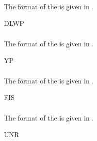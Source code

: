 \subsubsection{}\label{sec:DLWPBlock}
The format of the  is given in .
\begin{BlockTable}{DLWP}
  \label{tab:DLWPBlock}
\end{BlockTable}

\subsubsection{}\label{sec:YPBlock}
The format of the  is given in .
\begin{BlockTable}{YP}
  \label{tab:YPBlock}
\end{BlockTable}

\subsubsection{}\label{sec:FISBlock}
The format of the  is given in .
\begin{BlockTable}{FIS}
  \label{tab:FISBlock}
\end{BlockTable}

\subsubsection{}\label{sec:UNRBlock}
The format of the  is given in .
\begin{BlockTable}{UNR}
  \label{tab:UNRBlock}
\end{BlockTable}
